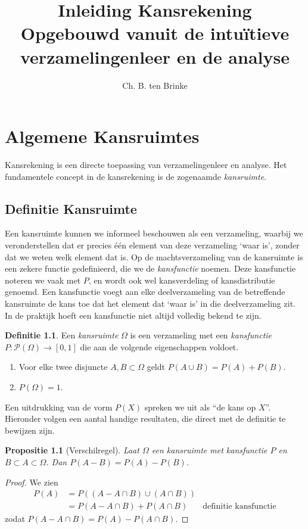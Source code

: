 \documentclass[a4paper]{report}
\title{Inleiding Kansrekening \\ \small{Opgebouwd vanuit de intu\"itieve verzamelingenleer en de analyse}}
\author{Ch. B. ten Brinke}
\newtheorem{proposition}[theorem]{Propositie}
\theoremstyle{definition}
\newtheorem{definition}[theorem]{Definitie}
\begin{document}
\maketitle

\chapter{Algemene Kansruimtes}
Kansrekening is een directe toepassing van verzamelingenleer en analyse.
Het fundamentele concept in de kansrekening is de zogenaamde \emph{kansruimte}.

\section{Definitie Kansruimte}
Een kansruimte kunnen we informeel beschouwen als een verzameling, waarbij we veronderstellen dat er precies \'e\'en element van deze verzameling `waar is', zonder dat we weten welk element dat is.
Op de machtsverzameling van de kansruimte is een zekere functie gedefinieerd, die we de \emph{kansfunctie} noemen.
Deze kansfunctie noteren we vaak met $P$, en wordt ook wel kansverdeling of kansdistributie genoemd.
Een kansfunctie voegt aan elke deelverzameling van de betreffende kansruimte de kans toe dat het element dat `waar is' in die deelverzameling zit.
In de praktijk hoeft een kansfunctie niet altijd volledig bekend te zijn.

\begin{definition}
    Een \emph{kansruimte} $\Omega$ is een verzameling met een \emph{kansfunctie} $P: \mathcal P(\Omega) \to [0,1]$  die aan de volgende eigenschappen voldoet.
    \begin{enumerate}[i]
        \item Voor elke twee disjuncte $A,B \subset \Omega$ geldt $P(A \cup B) = P(A) + P(B)$.
        \item $P(\Omega) = 1$.
    \end{enumerate}
\end{definition}

Een uitdrukking van de vorm $P(X)$ spreken we uit als ``de kans op $X$''.
Hieronder volgen een aantal handige resultaten, die direct met de definitie te bewijzen zijn.

\begin{proposition}[Verschilregel]
    \label{verschilregel}
    Laat $\Omega$ een kansruimte met kansfunctie $P$ en $B \subset A \subset \Omega$.
    Dan $P(A - B) = P(A) - P(B)$.
\end{proposition}
\begin{proof}
    We zien
    \begin{align*}
        P(A)    &= P( (A - A \cap B) \cup (A \cap B) ) \\
                &= P(A - A \cap B ) + P(A \cap B) & \text{definitie kansfunctie}
    \end{align*}
    zodat $P(A - A \cap B ) = P(A) - P(A \cap B) $.
\end{proof}
\end{document}
